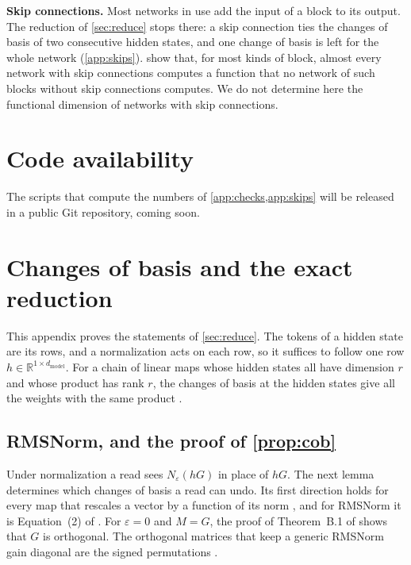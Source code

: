 \documentclass[10pt]{article}
\theoremstyle{definition}
\theoremstyle{remark}
\newcommand{\R}{\mathbb{R}}
\newcommand{\dm}{d_{\mathrm{model}}}
\newcommand{\para}[1]{\smallskip\noindent\textbf{#1}\hspace{0.5em}}
\begin{document}
\para{Skip connections.} Most networks in use add the input of a block to its output. The reduction of \cref{sec:reduce} stops there: a skip connection ties the changes of basis of two consecutive hidden states, and one change of basis is left for the whole network (\cref{app:skips}). \citet{mijoski2026worth} show that, for most kinds of block, almost every network with skip connections computes a function that no network of such blocks without skip connections computes. We do not determine here the functional dimension of networks with skip connections.

\section*{Code availability}
The scripts that compute the numbers of \cref{app:checks,app:skips} will be released in a public Git repository, coming soon.





\appendix
\section{Changes of basis and the exact reduction}\label{app:reduce}\label{app:proofs}

This appendix proves the statements of \cref{sec:reduce}. The tokens of a hidden state are its rows, and a normalization acts on each row, so it suffices to follow one row $h \in \R^{1\times\dm}$. For a chain of linear maps whose hidden states all have dimension $r$ and whose product has rank $r$, the changes of basis at the hidden states give all the weights with the same product \citep[Proposition~22]{trager2020pure}.

\subsection{RMSNorm, and the proof of \texorpdfstring{\cref{prop:cob}}{the proposition on changes of basis}}\label{app:prf-junction}

Under normalization a read sees $N_\varepsilon(hG)$ in place of $hG$. The next lemma determines which changes of basis a read can undo. Its first direction holds for every map that rescales a vector by a function of its norm \citep[Lemma~17]{ganev2021universal}, and for RMSNorm it is Equation~(2) of \citet{ashkboos2024slicegpt}. For $\varepsilon = 0$ and $M = G$, the proof of Theorem~B.1 of \citet{tran2025equivariant} shows that $G$ is orthogonal. The orthogonal matrices that keep a generic RMSNorm gain diagonal are the signed permutations \citep[Theorem~2.1]{sweeney2026transport}.
\end{document}
